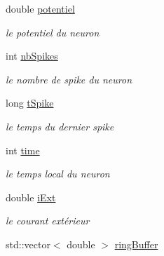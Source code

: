 \begin{DoxyCompactItemize}
\item 
\hypertarget{classNeuron_a36c756b0c54b9d258726d7b667feb63d}{double \hyperlink{classNeuron_a36c756b0c54b9d258726d7b667feb63d}{potentiel}}\label{classNeuron_a36c756b0c54b9d258726d7b667feb63d}

\begin{DoxyCompactList}\small\item\em le potentiel du neuron \end{DoxyCompactList}\item 
\hypertarget{classNeuron_a058e7be13216126efefec7891391d6df}{int \hyperlink{classNeuron_a058e7be13216126efefec7891391d6df}{nb\-Spikes}}\label{classNeuron_a058e7be13216126efefec7891391d6df}

\begin{DoxyCompactList}\small\item\em le nombre de spike du neuron \end{DoxyCompactList}\item 
\hypertarget{classNeuron_a6acf3f720bf2f6bd414a6f0617c6c373}{long \hyperlink{classNeuron_a6acf3f720bf2f6bd414a6f0617c6c373}{t\-Spike}}\label{classNeuron_a6acf3f720bf2f6bd414a6f0617c6c373}

\begin{DoxyCompactList}\small\item\em le temps du dernier spike \end{DoxyCompactList}\item 
\hypertarget{classNeuron_a03f92d2e014eb23e482a9894486391b9}{int \hyperlink{classNeuron_a03f92d2e014eb23e482a9894486391b9}{time}}\label{classNeuron_a03f92d2e014eb23e482a9894486391b9}

\begin{DoxyCompactList}\small\item\em le temps local du neuron \end{DoxyCompactList}\item 
\hypertarget{classNeuron_a1557475173454c5421e7c5f039845b5f}{double \hyperlink{classNeuron_a1557475173454c5421e7c5f039845b5f}{i\-Ext}}\label{classNeuron_a1557475173454c5421e7c5f039845b5f}

\begin{DoxyCompactList}\small\item\em le courant extérieur \end{DoxyCompactList}\item 
\hypertarget{classNeuron_a046113587b8763ee6d9dc52c590ed176}{std\-::vector$<$ double $>$ \hyperlink{classNeuron_a046113587b8763ee6d9dc52c590ed176}{ring\-Buffer}}\label{classNeuron_a046113587b8763ee6d9dc52c590ed176}


\end{DoxyCompactItemize}
